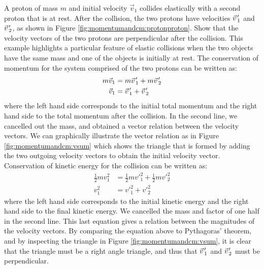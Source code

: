 \begin{example}{
 A proton of mass $m$ and initial velocity $\vec v_1$ collides elastically with a second proton that is at rest. After the collision, the two protons have velocities $\pvec v'_1$ and $\pvec v'_2$, as shown in Figure \ref{fig:momentumandcm:protonproton}. Show that the velocity vectors of the two protons are perpendicular after the collision.}
This example highlights a particular feature of elastic collisions when the two objects have the same mass and one of the objects is initially at rest. The conservation of momentum for the system comprised of the two protons can be written as:
\begin{align*}
m\vec v_1 &= m\pvec v'_1 + m\pvec v'_2\\
\vec v_1 &= \pvec v'_1 + \pvec v'_2\\
\end{align*}
where the left hand side corresponds to the initial total momentum and the right hand side to the total momentum after the collision. In the second line, we cancelled out the mass, and obtained a vector relation between the velocity vectors. We can graphically illustrate the vector relation as in Figure \ref{fig:momentumandcm:vsum} which shows the triangle that is formed by adding the two outgoing velocity vectors to obtain the initial velocity vector.
Conservation of kinetic energy for the collision can be written as:
\begin{align*}
\frac{1}{2}mv_1^2 &= \frac{1}{2}mv'^2_1+\frac{1}{2}mv'^2_2\\
v_1^2 &= v'^2_1+ v'^2_2
\end{align*}
where the left hand side corresponds to the initial kinetic energy and the right hand side to the final kinetic energy. We cancelled the mass and factor of one half in the second line. This last equation gives a relation between the magnitudes of the velocity vectors. By comparing the equation above to Pythagoras' theorem, and by inspecting the triangle in Figure \ref{fig:momentumandcm:vsum}, it is clear that the triangle must be a right angle triangle, and thus that $\pvec v'_1$ and $\pvec v'_2$ must be perpendicular.
\end{example}

